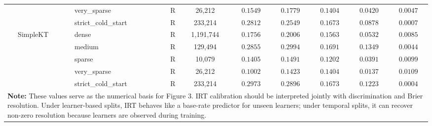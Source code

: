 \begin{table}[htbp]
{\begin{tabular}{lllrcccccc}
 &  & very\_sparse & R & 26,212 & $0.1549$ & $0.1779$ & $0.1404$ & $0.0420$ & $0.0047$ \\
 &  & strict\_cold\_start & R & 233,214 & $0.2812$ & $0.2549$ & $0.1673$ & $0.0878$ & $0.0007$ \\
 & SimpleKT & dense & R & 1,191,744 & $0.1756$ & $0.2006$ & $0.1563$ & $0.0532$ & $0.0085$ \\
 &  & medium & R & 129,494 & $0.2855$ & $0.2994$ & $0.1691$ & $0.1349$ & $0.0044$ \\
 &  & sparse & R & 10,079 & $0.1405$ & $0.1491$ & $0.1202$ & $0.0391$ & $0.0099$ \\
 &  & very\_sparse & R & 26,212 & $0.1002$ & $0.1423$ & $0.1404$ & $0.0137$ & $0.0109$ \\
 &  & strict\_cold\_start & R & 233,214 & $0.2973$ & $0.2896$ & $0.1673$ & $0.1223$ & $0.0004$ \\
\bottomrule
\multicolumn{10}{p{17.5cm}}{\scriptsize \textbf{Note:} These values serve as the numerical basis for Figure 3. IRT calibration should be interpreted jointly with discrimination and Brier resolution. Under learner-based splits, IRT behaves like a base-rate predictor for unseen learners; under temporal splits, it can recover non-zero resolution because learners are observed during training.} \\
\end{tabular}%
}
\end{table}
